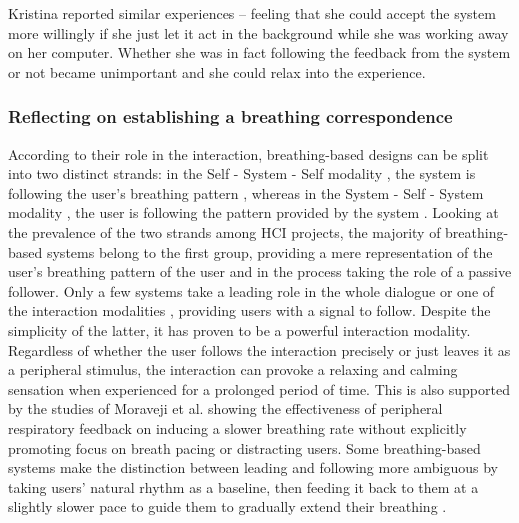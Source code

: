 Kristina reported similar experiences -- feeling that she could accept the system more willingly if she just let it act in the background while she was working away on her computer. Whether she was in fact following the feedback from the system or not became unimportant and she could relax into the experience.

\subsubsection*{Reflecting on establishing a breathing correspondence}

According to their role in the interaction, breathing-based designs can be split into two distinct strands: in the Self - System - Self modality \cite{prpa_inhaling_2020}, the system is following the user's breathing pattern \cite{abushakra_augmenting_2014, sonne_chillfish_2016, bingham_breath_2010, roo_inner_2017, prpa_hacking_2016, shaw_meditation_2007, aslan_hold_2016, pisa_towards_2017, sjoman_breathing_2018, moran_exopranayama_2016}, whereas in the System - Self - System modality \cite{prpa_inhaling_2020}, the user is following the pattern provided by the system \cite{wongsuphasawat_you_2012, yu_breathe_2015, soyka_enhancing_2016, dijk_breathe_2011}. Looking at the prevalence of the two strands among HCI projects, the majority of breathing-based systems belong to the first group, providing a mere representation of the user's breathing pattern of the user and in the process taking the role of a passive follower. Only a few systems take a leading role in the whole dialogue \cite{wongsuphasawat_you_2012, yu_breathe_2015, soyka_enhancing_2016} or one of the interaction modalities \cite{bumatay_investigating_2017, patibanda_life_2017}, providing users with a signal to follow. Despite the simplicity of the latter, it has proven to be a powerful interaction modality. Regardless of whether the user follows the interaction precisely or just leaves it as a peripheral stimulus, the interaction can provoke a relaxing and calming sensation when experienced for a prolonged period of time. This is also supported by the studies of Moraveji et al. \cite{moraveji_peripheral_2011, moraveji_breathtray_2012} showing the effectiveness of peripheral respiratory feedback on inducing a slower breathing rate without explicitly promoting focus on breath pacing or distracting users. Some breathing-based systems make the distinction between leading and following more ambiguous by taking users' natural rhythm as a baseline, then feeding it back to them at a slightly slower pace to guide them to gradually extend their breathing \cite{moraveji_peripheral_2011, ghandeharioun_brightbeat_2017}.

